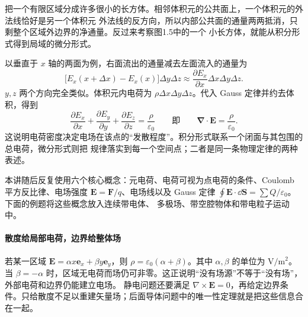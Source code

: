 把一个有限区域分成许多很小的长方体。相邻体积元的公共面上，一个体积元的外法线恰好是另一个体积元
外法线的反方向，所以内部公共面的通量两两抵消，只剩整个区域外边界的净通量。反过来考察图1.5中的一个
小长方体，就能从积分形式得到局域的微分形式。

\differentialCubeFigure
{}

以垂直于 $x$ 轴的两面为例，右面流出的通量减去左面流入的通量为
\[
  \bigl[E_x(x+\Delta x)-E_x(x)\bigr]\Delta y\Delta z
  \approx\frac{\partial E_x}{\partial x}\Delta x\Delta y\Delta z.
\]
$y,z$ 两个方向完全类似。体积元内电荷为
$\rho\Delta x\Delta y\Delta z$。代入 Gauss 定律并约去体积，得到
\begin{equation}
  \boxed{\frac{\partial E_x}{\partial x}
  +\frac{\partial E_y}{\partial y}
  +\frac{\partial E_z}{\partial z}
  =\frac{\rho}{\varepsilon_0}}
  \qquad\text{即}\qquad
  \boxed{\boldsymbol\nabla\cdot\boldsymbol E=\frac{\rho}{\varepsilon_0}}.
\end{equation}
这说明电荷密度决定电场在该点的“发散程度”。积分形式联系一个闭面与其包围的总电荷，微分形式则把
规律落实到每一个空间点；二者是同一条物理定律的两种表述。

本讲随后反复使用六个核心概念：元电荷、电荷可视为点电荷的条件、Coulomb 平方反比律、电场强度
$\boldsymbol E=\boldsymbol F/q$、电场线以及 Gauss 定律
$\oint\boldsymbol E\cdot\dd\boldsymbol S=\sum Q/\varepsilon_0$。下面的例题将这些概念放入连续带电体、
多极场、带空腔物体和带电粒子运动中。

\paragraph{散度给局部电荷，边界给整体场}
若某一区域 $\boldsymbol E=\alpha x\boldsymbol e_x+\beta y\boldsymbol e_y$，则
$\rho=\varepsilon_0(\alpha+\beta)$。其中 $\alpha,\beta$ 的单位为 $\mathrm{V/m^2}$。
当 $\beta=-\alpha$ 时，区域无电荷而场仍可非零。这正说明“没有场源”不等于“没有场”，外部电荷和边界仍能建立电场。
静电问题还要满足 $\nabla\times\boldsymbol E=0$，再给定边界条件。只给散度不足以重建矢量场；后面导体问题中的唯一性定理就是把这些信息合在一起。

